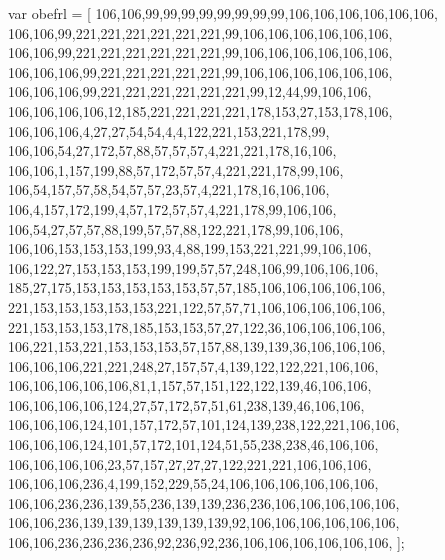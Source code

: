var obefrl = [
  106,106,99,99,99,99,99,99,99,99,106,106,106,106,106,106,
  106,106,99,221,221,221,221,221,221,99,106,106,106,106,106,106,
  106,106,99,221,221,221,221,221,221,99,106,106,106,106,106,106,
  106,106,106,99,221,221,221,221,221,99,106,106,106,106,106,106,
  106,106,106,99,221,221,221,221,221,221,99,12,44,99,106,106,
  106,106,106,106,12,185,221,221,221,221,178,153,27,153,178,106,
  106,106,106,4,27,27,54,54,4,4,122,221,153,221,178,99,
  106,106,54,27,172,57,88,57,57,57,4,221,221,178,16,106,
  106,106,1,157,199,88,57,172,57,57,4,221,221,178,99,106,
  106,54,157,57,58,54,57,57,23,57,4,221,178,16,106,106,
  106,4,157,172,199,4,57,172,57,57,4,221,178,99,106,106,
  106,54,27,57,57,88,199,57,57,88,122,221,178,99,106,106,
  106,106,153,153,153,199,93,4,88,199,153,221,221,99,106,106,
  106,122,27,153,153,153,199,199,57,57,248,106,99,106,106,106,
  185,27,175,153,153,153,153,153,57,57,185,106,106,106,106,106,
  221,153,153,153,153,153,221,122,57,57,71,106,106,106,106,106,
  221,153,153,153,178,185,153,153,57,27,122,36,106,106,106,106,
  106,221,153,221,153,153,153,57,157,88,139,139,36,106,106,106,
  106,106,106,221,221,248,27,157,57,4,139,122,122,221,106,106,
  106,106,106,106,106,81,1,157,57,151,122,122,139,46,106,106,
  106,106,106,106,124,27,57,172,57,51,61,238,139,46,106,106,
  106,106,106,124,101,157,172,57,101,124,139,238,122,221,106,106,
  106,106,106,124,101,57,172,101,124,51,55,238,238,46,106,106,
  106,106,106,106,23,57,157,27,27,27,122,221,221,106,106,106,
  106,106,106,236,4,199,152,229,55,24,106,106,106,106,106,106,
  106,106,236,236,139,55,236,139,139,236,236,106,106,106,106,106,
  106,106,236,139,139,139,139,139,139,92,106,106,106,106,106,106,
  106,106,236,236,236,236,92,236,92,236,106,106,106,106,106,106,
];


